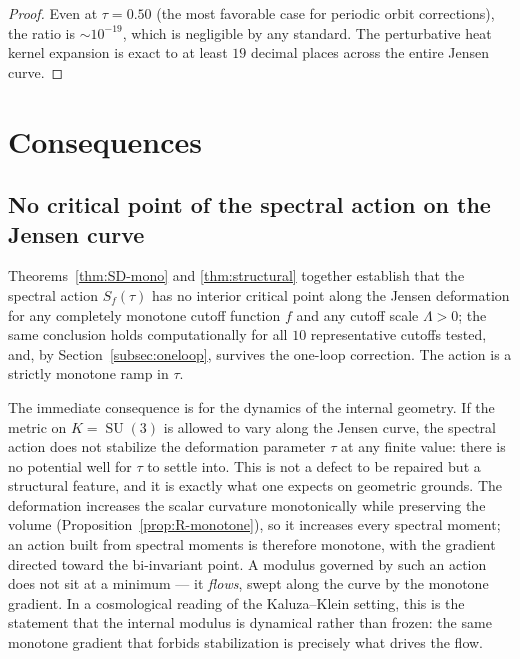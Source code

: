 \documentclass[12pt]{article}
\theoremstyle{definition}
\theoremstyle{remark}
\DeclareMathOperator{\SU}{SU}
\begin{document}
\begin{proof}
Even at $\tau = 0.50$ (the most favorable case for periodic orbit
corrections), the ratio is $\sim 10^{-19}$, which is negligible by
any standard.  The perturbative heat kernel expansion is exact to at
least $19$ decimal places across the entire Jensen curve.
\end{proof}


\section{Consequences}\label{sec:consequences}

\subsection{No critical point of the spectral action on the Jensen curve}

Theorems~\ref{thm:SD-mono} and \ref{thm:structural} together
establish that the spectral action $S_f(\tau)$ has no interior critical
point along the Jensen deformation for any completely monotone cutoff
function $f$ and any cutoff scale $\Lambda > 0$; the same conclusion
holds computationally for all $10$ representative cutoffs tested, and,
by Section~\ref{subsec:oneloop}, survives the one-loop correction.
The action is a strictly monotone ramp in $\tau$.

The immediate consequence is for the dynamics of the internal geometry.
If the metric on $K = \SU(3)$ is allowed to vary along the Jensen
curve, the spectral action does not stabilize the deformation parameter
$\tau$ at any finite value: there is no potential well for $\tau$ to
settle into.  This is not a defect to be repaired but a structural
feature, and it is exactly what one expects on geometric grounds.  The
deformation increases the scalar curvature monotonically while
preserving the volume (Proposition~\ref{prop:R-monotone}), so it
increases every spectral moment; an action built from spectral moments
is therefore monotone, with the gradient directed toward the
bi-invariant point.  A modulus governed by such an action does not sit
at a minimum --- it \emph{flows}, swept along the curve by the monotone
gradient.  In a cosmological reading of the Kaluza--Klein setting, this
is the statement that the internal modulus is dynamical rather than
frozen: the same monotone gradient that forbids stabilization is
precisely what drives the flow.
\end{document}
